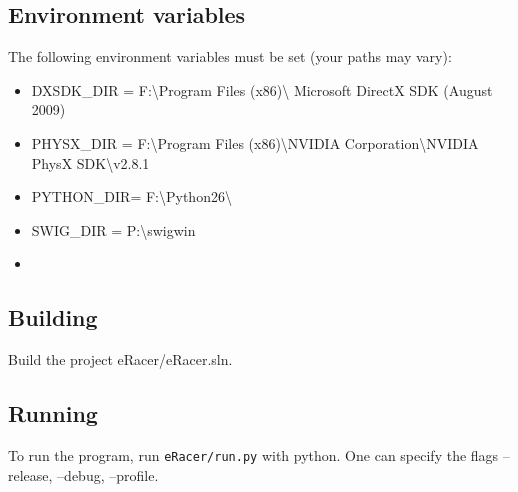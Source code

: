 \documentclass[11pt]{article}
\begin{document}
\subsection{Environment variables}

The following environment variables
must be set (your paths may vary):

\begin{itemize}
  \item DXSDK_DIR = F:\textbackslash Program Files (x86)\textbackslash
  Microsoft DirectX SDK (August 2009)
  \item PHYSX_DIR = F:\textbackslash Program Files (x86)\textbackslash NVIDIA
  Corporation\textbackslash NVIDIA PhysX SDK\textbackslash v2.8.1
  \item PYTHON_DIR= F:\textbackslash Python26\textbackslash
  \item SWIG_DIR  = P:\textbackslash swigwin\item 
\end{itemize}  
 
\subsection{Building}

Build the project eRacer/eRacer.sln.

\subsection{Running}  
  
To run the program, run \texttt{eRacer/run.py} with python. One can specify the
flags --release, --debug, --profile.
\end{document}
